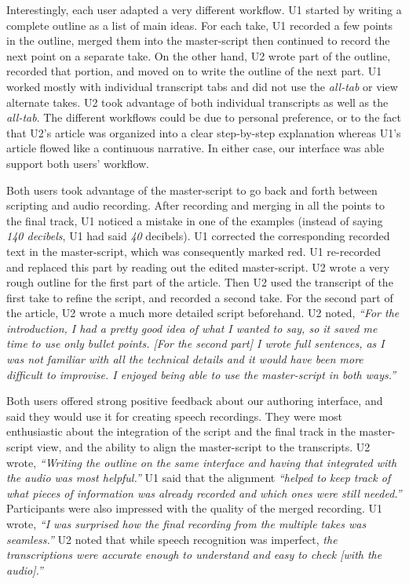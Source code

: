 Interestingly, each user adapted a very different workflow. U1 started by writing a complete outline as a list of main ideas. For each take, U1 recorded a few points in the outline, merged them into the master-script then continued to record the next point on a separate take. On the other hand, U2 wrote part of the outline, recorded that portion, and moved on to write the outline of the next part. U1 worked mostly with individual transcript
tabs and did not use the \textit{all-tab} or view alternate takes. U2 took advantage of both individual transcripts as well as the \textit{all-tab}. The different workflows could be due to personal preference, or  to the fact that U2's article was organized into a clear step-by-step explanation whereas U1's article flowed like a continuous narrative. In either case, our interface was able support both users' workflow. 

Both users took advantage of the master-script to go back and forth between scripting and audio recording. After recording and merging in all the points
to the final track, U1 noticed a mistake in one of the examples
(instead of saying \textit{140 decibels}, U1 had said \textit{40}
decibels). U1 corrected the corresponding recorded text in the
master-script, which was consequently marked red. U1 re-recorded
and replaced this part by reading out the edited master-script.
U2 wrote a very rough outline for the first part of the article. Then U2 used the transcript of the first take to refine the script, and recorded a second take. For the second part of the article, U2 wrote a much more detailed script beforehand. U2 noted,  \textit{``For the introduction, I had a pretty good idea of what I wanted to say, so it saved me time to use only bullet points. [For the second part] I wrote full sentences, as I was not familiar with all the technical details and it would have been more difficult
to improvise. I enjoyed being able to use the master-script in both ways.''
}


Both users offered strong positive feedback about our authoring
interface, and said they would use it for creating speech recordings. They were most enthusiastic about the integration
of the script and the final track in the master-script view,
and the ability to align the master-script to the transcripts.
U2 wrote, \textit{``Writing the outline on the same interface and having
that integrated with the audio was most helpful.''}  U1 said
that the alignment \textit{``helped to keep track of what pieces
of information was already recorded and which ones were still
needed.''} Participants were also impressed with the quality
of the merged recording. U1 wrote, \textit{``I was surprised
how the final recording from the multiple takes was seamless.''} U2 noted that while speech recognition was imperfect, \textit{the transcriptions were accurate enough to understand and easy to check [with the audio].''}


